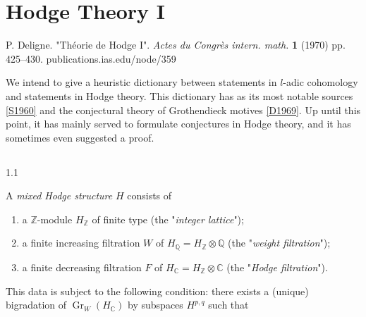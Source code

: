 \part{Hodge Theory I}\label{hodge-theory-i}\thispagestyle{fancy}\par{}P. Deligne.
  "Théorie de Hodge I".
  \emph{Actes du Congrès intern. math.} \textbf{1} (1970) pp. 425–430.
  publications.ias.edu/node/359\par{}We intend to give a heuristic dictionary between statements in \(l\)-adic cohomology and statements in Hodge theory.
  This dictionary has as its most notable sources \hyperref[S1960]{[S1960]} and the conjectural theory of Grothendieck motives \hyperref[D1969]{[D1969]}.
  Up until this point, it has mainly served to formulate conjectures in Hodge theory, and it has sometimes even suggested a proof.\chapter{}\thispagestyle{fancy}\label{hodge-theory-i-1}\begin{definition}{1.1}\label{hodge-theory-i-definition-1.1}\skipsinglepar\par{}A \emph{mixed Hodge structure} \(H\) consists of

    
 \begin{enumerate}
      
 \item[(a)]
        a \(\mathbb {Z}\)-module \(H_\mathbb {Z}\) of finite type (the "\emph{integer lattice}");
      

      
 \item[(b)]
        a finite increasing filtration \(W\) of \(H_\mathbb {Q}=H_\mathbb {Z}\otimes \mathbb {Q}\) (the "\emph{weight filtration}");
      

      
 \item[(c)]
        a finite decreasing filtration \(F\) of \(H_\mathbb {C}=H_\mathbb {Z}\otimes \mathbb {C}\) (the "\emph{Hodge filtration}").
      

    \end{enumerate}


    This data is subject to the following condition:
    there exists a (unique) bigradation of \(\operatorname {Gr}_W(H_\mathbb {C})\) by subspaces \(H^{p,q}\) such that

    
 \begin{enumerate}
      

\end{enumerate}
\end{definition}
